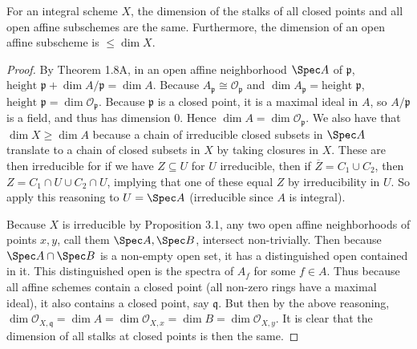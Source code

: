 \begin{lem}\label{lem:stalk_dim}
	For an integral scheme $X $, the dimension of the stalks of all closed points and all open affine subschemes are the same.
	Furthermore, the dimension of an open affine subscheme is $\le  \dim X$.
\end{lem}
\begin{proof}
	By Theorem 1.8A, in an open affine neighborhood $\Spec A $ of $\mathfrak{p} $, $\text{height }\mathfrak{p} + \dim A / \mathfrak{p} = \dim A $.
	Because $A_{\mathfrak{p}} \cong \mathcal{O}_{\mathfrak{p}}$ and $\dim A_{\mathfrak{p}} = \text{height }\mathfrak{p} $, $\text{height }\mathfrak{p} = \dim \mathcal{O}_{\mathfrak{p}} $.
	Because $\mathfrak{p} $ is a closed point, it is a maximal ideal in $A $, so $A / \mathfrak{p} $ is a field, and thus has dimension 0.
	Hence $\dim A = \dim \mathcal{O}_{\mathfrak{p}} $.
	We also have that $\dim X \ge \dim A $ because a chain of irreducible closed subsets in $\Spec A $ translate to a chain of closed subsets in $X $ by taking closures in $X $.
	These are then irreducible for if we have $Z \subseteq U $ for $U $ irreducible, then if $\overline{Z} = C_1 \cup C_{2}$, then $Z = C_{1} \cap U \cup C_{2} \cap U $, implying that one of these equal $Z $ by irreducibility in $U $.
	So apply this reasoning to $U=\Spec A $ (irreducible since $A $ is integral).

	Because $ X$ is irreducible by Proposition 3.1, any two open affine neighborhoods of points $x,y $, call them $\Spec A, \Spec B $, intersect non-trivially.
	Then because $\Spec A \cap \Spec B $ is a non-empty open set, it has a distinguished open contained in it.
	This distinguished open is the spectra of $A_f $ for some $f\in A $.
	Thus because all affine schemes contain a closed point (all non-zero rings have a maximal ideal), it also contains a closed point, say $\mathfrak{q} $.
	But then by the above reasoning, $\dim \mathcal{O}_{X,\mathfrak{q}} = \dim A = \dim \mathcal{O}_{X,x} = \dim B = \dim \mathcal{O}_{X,y}$.
	It is clear that the dimension of all stalks at closed points is then the same.
\end{proof}

